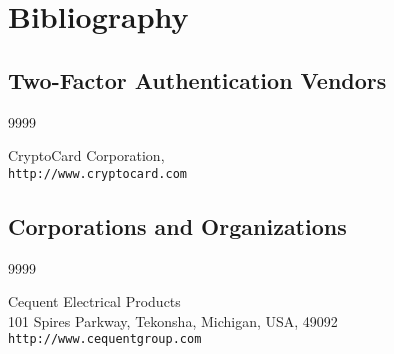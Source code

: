 
%
\chapter*{Bibliography}



\nocite{*}


\section*{Two-Factor Authentication Vendors}

\begin{thecustombibliography}{9999}

CryptoCard Corporation,\\
\texttt{http://www.cryptocard.com}

\end{thecustombibliography}



\section*{Corporations and Organizations}

\begin{thecustombibliography}{9999}

Cequent Electrical Products\\
101 Spires Parkway, Tekonsha, Michigan, USA, 49092\\
\texttt{http://www.cequentgroup.com}

\end{thecustombibliography}

